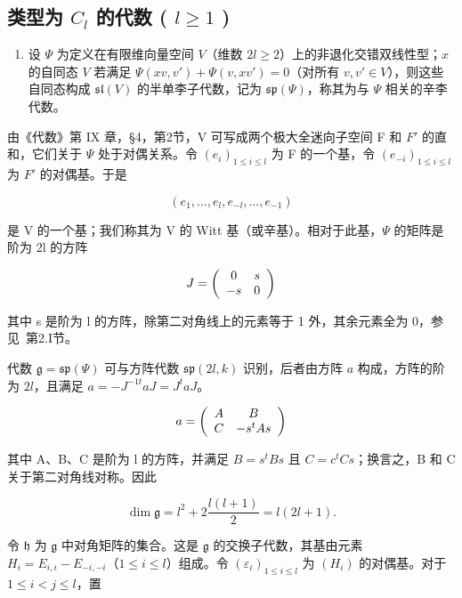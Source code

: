 \subsection{\texorpdfstring{类型为 \(C_{l}\) 的代数 ( \(l \geq 1\) )}{类型为 C\_\{l\} 的代数 ( l \textbackslash geq 1 )}}

\begin{enumerate}
\def\labelenumi{(\Roman{enumi})}
\tightlist
\item
设 \(\varPsi\) 为定义在有限维向量空间 \(V\)（维数 \(2l \geq 2\)）上的非退化交错双线性型；\(x\) 的自同态 \(V\) 若满足 \(\varPsi(xv, v') + \varPsi(v, xv') = 0\)（对所有 \(v, v' \in V\)），则这些自同态构成 \(\mathfrak{sl}(V)\) 的半单李子代数，记为 \(\mathfrak{sp}(\varPsi)\)，称其为与 \(\varPsi\) 相关的辛李代数。
\end{enumerate}

由《代数》第 IX 章，§4，第2节，V 可写成两个极大全迷向子空间 F 和 \(F'\) 的直和，它们关于 \(\Psi\) 处于对偶关系。令 \((e_{i})_{1\leq i\leq l}\) 为 F 的一个基，令 \((e_{-i})_{1\leq i\leq l}\) 为 \(F'\) 的对偶基。于是

\[
(e _ {1}, \dots , e _ {l}, e _ {- l}, \dots , e _ {- 1})
\]

是 V 的一个基；我们称其为 V 的 Witt 基（或辛基）。相对于此基，\(\varPsi\) 的矩阵是阶为 2l 的方阵

\[
J = \left( \begin{array}{c c} 0 & s \\ - s & 0 \end{array} \right)
\]

其中 s 是阶为 l 的方阵，除第二对角线上的元素等于 1 外，其余元素全为 0，参见~第2.I节。

代数 \(\mathfrak{g} = \mathfrak{sp}(\varPsi)\) 可与方阵代数 \(\mathfrak{sp}(2l,k)\) 识别，后者由方阵 \(a\) 构成，方阵的阶为 \(2l\)，且满足 \(a = -J^{-1t}aJ = J^t aJ\)。

\[
a = \left( \begin{array}{c c} A & B \\ C & - s ^ {t} A s \end{array} \right)
\]

其中 A、B、C 是阶为 l 的方阵，并满足 \(B = s^{t}Bs\) 且 \(C = c^{t}Cs\)；换言之，B 和 C 关于第二对角线对称。因此

\[
\dim \mathfrak {g} = l ^ {2} + 2 \frac {l (l + 1)}{2} = l (2 l + 1).
\]

令 \(\mathfrak{h}\) 为 \(\mathfrak{g}\) 中对角矩阵的集合。这是 \(\mathfrak{g}\) 的交换子代数，其基由元素 \(H_{i} = E_{i,i} - E_{-i,-i}\)（\(1 \leq i \leq l\)）组成。令 \((\varepsilon_{i})_{1 \leq i \leq l}\) 为 \((H_{i})\) 的对偶基。对于 \(1 \leq i < j \leq l\)，置


